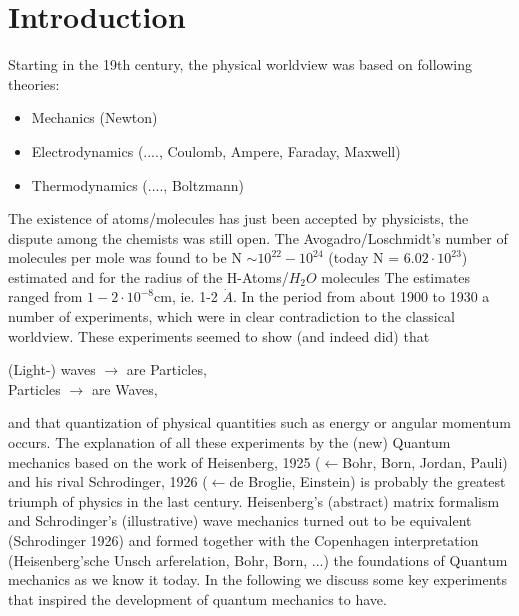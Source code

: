 \chapter{Introduction}
Starting in the 19th century, the physical worldview was based on following theories:
\begin{itemize}
    \item Mechanics (Newton)
    \item Electrodynamics (...., Coulomb, Ampere, Faraday, Maxwell)
    \item Thermodynamics (...., Boltzmann)
\end{itemize}
The existence of atoms/molecules has just been accepted by physicists, the dispute among the chemists was still open. The Avogadro/Loschmidt's number of molecules per mole was found to be N $\sim {10}^{22}-{10}^{24}$
(today N = $6.02\cdot10^{23}$) estimated and for the radius of the H-Atoms/$H_{2}O$ molecules
The estimates ranged from $1 - 2\cdot10^{-8} $cm, ie.
1-2 $\dot{A}$. In the period from about 1900 to 1930 a number of experiments, which were in clear contradiction to the classical worldview. These
experiments seemed to show (and indeed did) that
\begin{center}
(Light-) waves $\to$  are Particles,\\
Particles $\to$  are Waves,
\end{center}
and that quantization of physical quantities such as energy or angular momentum occurs. The explanation of all these experiments by the (new) Quantum mechanics based on the work of Heisenberg, 1925 ($\gets$Bohr, Born, Jordan, Pauli) and his rival Schrodinger, 1926 ($\gets$de Broglie, Einstein) is probably the greatest triumph of physics in the last century. Heisenberg's (abstract) matrix formalism and Schrodinger's (illustrative) wave mechanics turned out to be equivalent (Schrodinger
1926) and formed together with the Copenhagen interpretation
(Heisenberg'sche Unsch arferelation, Bohr, Born, ...) the foundations of
Quantum mechanics as we know it today. In the following we discuss
some key experiments that inspired the development of quantum mechanics
to have.

